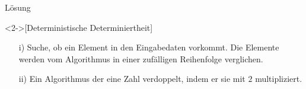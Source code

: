 \begin{frame}[c]{Lösung}
    \begin{solve}<2->[Deterministische Determiniertheit]
        \pause{}\begin{enumerate}[<+(1)->]
            \item[i)] Suche, ob ein Element in den Eingabedaten vorkommt.\pause{} Die Elemente werden vom Algorithmus in einer zufälligen Reihenfolge verglichen.
            \item[ii)] Ein Algorithmus der eine Zahl verdoppelt, indem er sie mit \(2\) multipliziert.
        \end{enumerate}
    \end{solve}
\end{frame}
\fi

